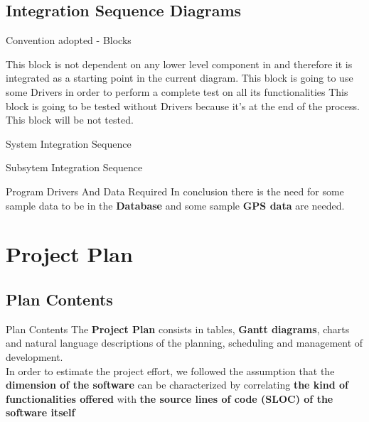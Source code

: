 \documentclass{../Common/Structure/pdf_presentation}
\begin{document}
	\subsection{Integration Sequence Diagrams}
	\begin{frame}{Convention adopted - Blocks}
		\begin{itemize}
			 This block is not dependent on any lower level component in \PowerEnJoy{} and therefore it is integrated as a starting point in the current diagram.
			 This block is going to use some Drivers in order to perform a complete test on all its functionalities
			 This block is going to be tested without Drivers because it's at the end of the process.
				This block will be not tested.
		\end{itemize}
	\end{frame}
	\begin{frame}{System Integration Sequence}
	\end{frame}
	\begin{frame}{Subsytem Integration Sequence}
	\end{frame}
	\begin{frame}{Program Drivers And Data Required}
		In conclusion there is the need for some sample data to be in the \textbf{Database} and some sample \textbf{GPS data} are needed.
	\end{frame}
	\section{Project Plan}
	\subsection{Plan Contents}
	\begin{frame}{Plan Contents}
		The \textbf{Project Plan} consists in tables, \textbf{Gantt diagrams}, charts and natural language descriptions of the planning, scheduling and management of \PowerEnJoy{} development. \\
		\medskip
		In order to estimate the project effort, we followed the assumption that the \textbf{dimension of the software} can be characterized by correlating \textbf{the kind of functionalities offered} with \textbf{the source lines of code (SLOC) of the software itself}
	\end{frame}
\end{document}

